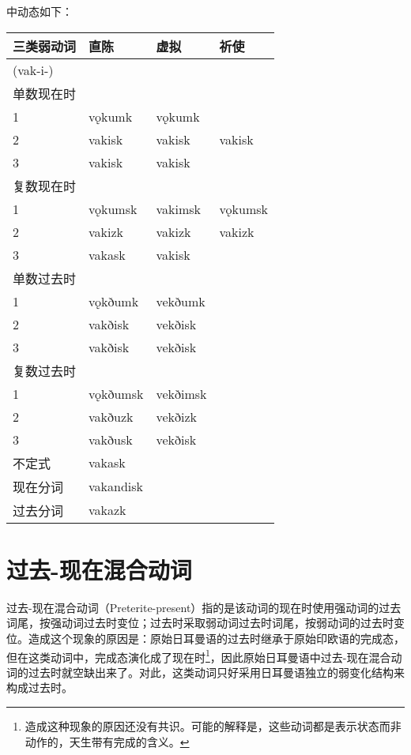 中动态如下：

\begin{longtable}{llll}
    \toprule
    三类弱动词    & 直陈        & 虚拟       & 祈使      \\
    \midrule
    \endhead
    \bottomrule
    \endfoot
    (vak-i-) &           &          &         \\
    单数现在时    &           &          &         \\
    1        & vǫkumk    & vǫkumk   &         \\
    2        & vakisk    & vakisk   & vakisk  \\
    3        & vakisk    & vakisk   &         \\
    复数现在时    &           &          &         \\
    1        & vǫkumsk   & vakimsk  & vǫkumsk \\
    2        & vakizk    & vakizk   & vakizk  \\
    3        & vakask    & vakisk   &         \\
    单数过去时    &           &          &         \\
    1        & vǫkðumk   & vekðumk  &         \\
    2        & vakðisk   & vekðisk  &         \\
    3        & vakðisk   & vekðisk  &         \\
    复数过去时    &           &          &         \\
    1        & vǫkðumsk  & vekðimsk &         \\
    2        & vakðuzk   & vekðizk  &         \\
    3        & vakðusk   & vekðisk  &         \\
    不定式      & vakask    &          &         \\
    现在分词     & vakandisk &          &         \\
    过去分词     & vakazk    &          &         \\
\end{longtable}

\section{过去-现在混合动词}\label{过去-现在混合动词}

过去-现在混合动词（Preterite-present）指的是该动词的现在时使用强动词的过去词尾，按强动词过去时变位；过去时采取弱动词过去时词尾，按弱动词的过去时变位。造成这个现象的原因是：原始日耳曼语的过去时继承于原始印欧语的完成态，但在这类动词中，完成态演化成了现在时\footnote{造成这种现象的原因还没有共识。可能的解释是，这些动词都是表示状态而非动作的，天生带有完成的含义。}，因此原始日耳曼语中过去-现在混合动词的过去时就空缺出来了。对此，这类动词只好采用日耳曼语独立的弱变化结构来构成过去时。


